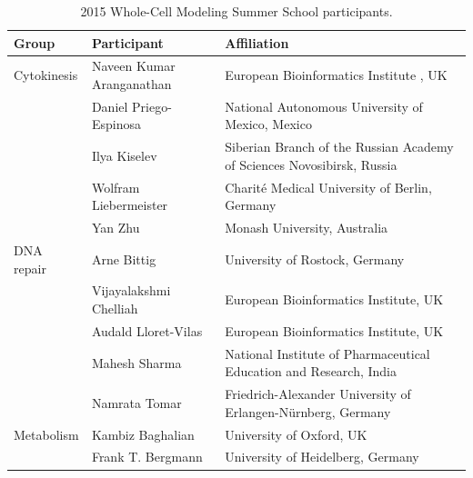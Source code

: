 \documentclass[journal,transmag]{IEEEtran}
\begin{document}
\vfill



\clearpage
\setcounter{table}{0}
\renewcommand{\thetable}{S\Roman{table}}

\begin{table}[ht!]
\caption{2015 Whole-Cell Modeling Summer School participants.}
\begin{tabularx}{\textwidth}{llX}
\toprule
\textbf{Group}           & \textbf{Participant}            & \textbf{Affiliation}\\
\midrule
Cytokinesis               & Naveen Kumar Aranganathan        & European Bioinformatics Institute , UK\\
                          & Daniel Priego-Espinosa           & National Autonomous University of Mexico, Mexico\\
                          & Ilya Kiselev                     & Siberian Branch of the Russian Academy of Sciences Novosibirsk, Russia\\
                          & Wolfram Liebermeister            & Charit\'e Medical University of Berlin, Germany\\
                          & Yan Zhu                          & Monash University, Australia\\
\midrule
DNA repair                & Arne Bittig                      & University of Rostock, Germany\\
                          & Vijayalakshmi Chelliah           & European Bioinformatics Institute, UK\\
                          & Audald Lloret-Vilas              & European Bioinformatics Institute, UK\\
                          & Mahesh Sharma                    & National Institute of Pharmaceutical Education and Research, India\\
                          & Namrata Tomar                    & Friedrich-Alexander University of Erlangen-N\"urnberg, Germany\\
\midrule
Metabolism                & Kambiz Baghalian                 & University of Oxford, UK\\
                          & Frank T. Bergmann                & University of Heidelberg, Germany\\

\end{tabularx}
\end{table}
\end{document}
